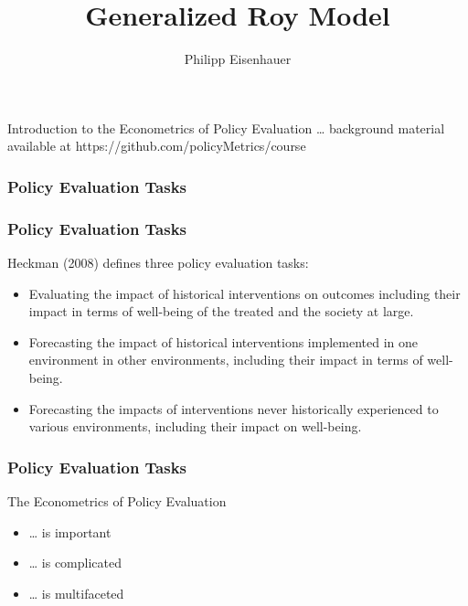 

\title{Generalized Roy Model}
\author{Philipp Eisenhauer}

\date{}

\let\otp\titlepage


\maketitle

    
\begin{frame}

{Introduction to the Econometrics of Policy Evaluation}\label{introduction-to-the-econometrics-of-policy-evaluation}
 \ldots{} background material available at
https://github.com/policyMetrics/course 
\subsubsection{Policy Evaluation Tasks}\label{policy-evaluation-tasks}

\end{frame}

\begin{frame}
\frametitle{Policy Evaluation Tasks}
Heckman (2008) defines three policy evaluation tasks:
\begin{itemize}
\item
  Evaluating the impact of historical interventions on outcomes
  including their impact in terms of well-being of the treated and the
  society at large.
\item
  Forecasting the impact of historical interventions implemented in one
  environment in other environments, including their impact in terms of
  well-being.
\item
  Forecasting the impacts of interventions never historically
  experienced to various environments, including their impact on
  well-being.
\end{itemize}

\end{frame}
    
\begin{frame}
\frametitle{Policy Evaluation Tasks}
 The Econometrics of Policy Evaluation
\begin{itemize}
\item
 \ldots{} is important
\item
  \ldots{} is complicated
\item
  \ldots{} is multifaceted
\end{itemize}
\end{frame}  

